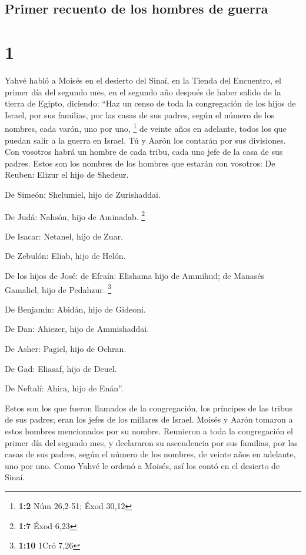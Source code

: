 \hypertarget{primer-recuento-de-los-hombres-de-guerra}{%
\subsection{Primer recuento de los hombres de
guerra}\label{primer-recuento-de-los-hombres-de-guerra}}

\hypertarget{section}{%
\section{1}\label{section}}

 Yahvé habló a Moisés en el desierto del Sinaí, en la
Tienda del Encuentro, el primer día del segundo mes, en el segundo año
después de haber salido de la tierra de Egipto, diciendo: 
``Haz un censo de toda la congregación de los hijos de Israel, por sus
familias, por las casas de sus padres, según el número de los nombres,
cada varón, uno por uno, \footnote{\textbf{1:2} Núm 26,2-51; Éxod 30,12}
 de veinte años en adelante, todos los que puedan salir a
la guerra en Israel. Tú y Aarón los contarán por sus divisiones.
 Con vosotros habrá un hombre de cada tribu, cada uno jefe
de la casa de sus padres.  Estos son los nombres de los
hombres que estarán con vosotros: De Reuben: Elizur el hijo de Shedeur.

 De Simeón: Shelumiel, hijo de Zurishaddai.

 De Judá: Nahsón, hijo de Aminadab. \footnote{\textbf{1:7}
  Éxod 6,23}

 De Isacar: Netanel, hijo de Zuar.

 De Zebulón: Eliab, hijo de Helón.

 De los hijos de José: de Efraín: Elishama hijo de
Ammihud; de Manasés Gamaliel, hijo de Pedahzur. \footnote{\textbf{1:10}
  1Cró 7,26}

 De Benjamín: Abidán, hijo de Gideoni.

 De Dan: Ahiezer, hijo de Ammishaddai.

 De Asher: Pagiel, hijo de Ochran.

 De Gad: Eliasaf, hijo de Deuel.

 De Neftalí: Ahira, hijo de Enán''.

 Estos son los que fueron llamados de la congregación,
los príncipes de las tribus de sus padres; eran los jefes de los
millares de Israel.  Moisés y Aarón tomaron a estos
hombres mencionados por su nombre.  Reunieron a toda la
congregación el primer día del segundo mes, y declararon su ascendencia
por sus familias, por las casas de sus padres, según el número de los
nombres, de veinte años en adelante, uno por uno.  Como
Yahvé le ordenó a Moisés, así los contó en el desierto de Sinaí.

